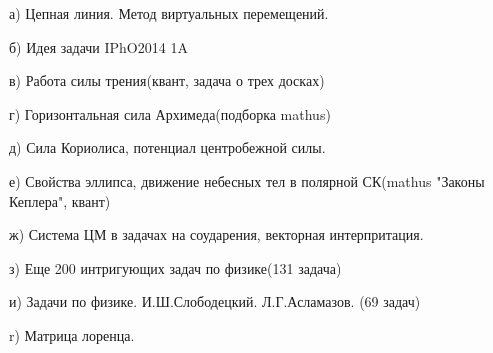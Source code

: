 \documentclass{article}
\begin{document}
{{а) Цепная линия. Метод виртуальных перемещений.

б) Идея задачи IPhO2014 1A

в) Работа силы трения(квант, задача о трех досках)

г) Горизонтальная сила Архимеда(подборка mathus)

д) Сила Кориолиса, потенциал центробежной силы.

е) Свойства эллипса, движение небесных тел в полярной СК(mathus "Законы Кеплера", квант)

ж) Система ЦМ в задачах на соударения, векторная интерпритация.

з) Еще 200 интригующих задач по физике(131 задача)

и) Задачи по физике. И.Ш.Слободецкий. Л.Г.Асламазов. (69 задач)

r) Матрица лоренца.

}
}
\end{document}

